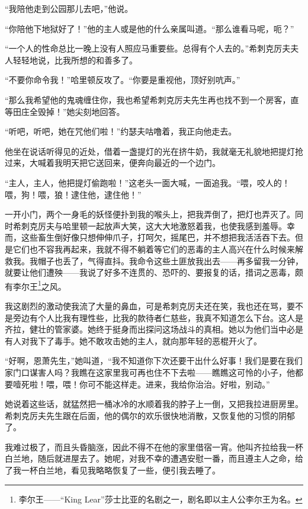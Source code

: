 \par “我陪他走到公园那儿去吧，”他说。
\par “你陪他下地狱好了！”他的主人或是他的什么亲属叫道。“那么谁看马呢，呃？”
\par “一个人的性命总比一晚上没有人照应马重要些。总得有个人去的。”希刺克厉夫夫人轻轻地说，比我所想的和善多了。
\par “不要你命令我！”哈里顿反攻了。“你要是重视他，顶好别吭声。”
\par “那么我希望他的鬼魂缠住你，我也希望希刺克厉夫先生再也找不到一个房客，直等田庄全毁掉！”她尖刻地回答。
\par “听吧，听吧，她在咒他们啦！”约瑟夫咕噜着，我正向他走去。
\par 他坐在说话听得见的近处，借着一盏提灯的光在挤牛奶，我就毫无礼貌地把提灯抢过来，大喊着我明天把它送回来，便奔向最近的一个边门。
\par “主人，主人，他把提灯偷跑啦！”这老头一面大喊，一面追我。“喂，咬人的！喂，狗！喂，狼！逮住他，逮住他！”
\par 一开小门，两个一身毛的妖怪便扑到我的喉头上，把我弄倒了，把灯也弄灭了。同时希刺克厉夫与哈里顿一起放声大笑，这大大地激怒着我，也使我感到羞辱。幸而，这些畜生倒好像只想伸伸爪子，打呵欠，摇尾巴，并不想把我活活吞下去。但是它们也不容我再起来，我就不得不躺着等它们的恶毒的主人高兴在什么时候来解救我。我帽子也丢了，气得直抖。我命令这些土匪放我出去——再多留我一分钟，就要让他们遭殃——我说了好多不连贯的、恐吓的、要报复的话，措词之恶毒，颇有李尔王\footnote{李尔王——“King Lear”莎士比亚的名剧之一，剧名即以主人公李尔王为名。}之风。
\par 我这剧烈的激动使我流了大量的鼻血，可是希刺克厉夫还在笑，我也还在骂，要不是旁边有个人比我有理性些，比我的款待者仁慈些，我真不知道怎么下台。这人是齐拉，健壮的管家婆。她终于挺身而出探问这场战斗的真相。她以为他们当中必是有人对我下了毒手。她不敢攻击她的主人，就向那年轻的恶棍开火了。
\par “好啊，恩萧先生，”她叫道，“我不知道你下次还要干出什么好事！我们是要在我们家门口谋害人吗？我瞧在这家里我可再也住不下去啦——瞧瞧这可怜的小子，他都要噎死啦！喂，喂！你可不能这样走。进来，我给你治治。好啦，别动。”
\par 她说着这些话，就猛然把一桶冰冷的水顺着我的脖子上一倒，又把我拉进厨房里。希刺克厉夫先生跟在后面，他的偶尔的欢乐很快地消散，又恢复他的习惯的阴郁了。
\par 我难过极了，而且头昏脑涨，因此不得不在他的家里借宿一宵。他叫齐拉给我一杯白兰地，随后就进屋去了。她呢，对我不幸的遭遇安慰一番，而且遵主人之命，给了我一杯白兰地，看见我略略恢复了一些，便引我去睡了。


